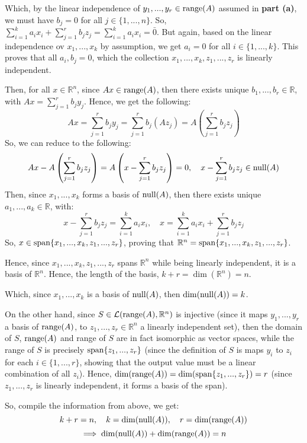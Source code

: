 \documentclass{article}
\begin{document}
\begin{itemize}
    Which, by the linear independence of $y_1,...,y_r\in\textmd{range}(A)$ assumed in \textbf{part (a)}, we must have $b_j = 0$ for all $j\in\{1,...,n\}$. So, $\sum_{i=1}^{k}a_ix_i+\sum_{j=1}^{r}b_jz_j = \sum_{i=1}^{k}a_ix_i = \bar{0}$. But again, based on the linear independence ov $x_1,...,x_k$ by assumption, we get $a_i=0$ for all $i\in\{1,...,k\}$.
    This proves that all $a_i,b_j = 0$, which the collection $x_1,...,x_k,z_1,...,z_r$ is linearly independent.

    Then, for all $x\in\mathbb{R}^n$, since $Ax \in\textmd{range}(A)$, then there exists unique $b_1,...,b_r\in\mathbb{R}$, with $Ax =\sum_{j=1}^{r}b_jy_j$. Hence, we get the following:
    $$Ax=\sum_{j=1}^{r}b_jy_j=\sum_{j=1}^{r}b_j(Az_j) = A\left(\sum_{j=1}^{r}b_jz_j\right)$$
    So, we can reduce to the following:
    $$Ax-A\left(\sum_{j=1}^{r}b_jz_j\right)=A\left(x-\sum_{j=1}^{r}b_jz_j\right) = 0,\quad x-\sum_{j=1}^{r}b_jz_j\in\textmd{null}(A)$$
    Then, since $x_1,...,x_k$ forms a basis of $\textmd{null}(A)$, then there exists unique $a_1,...,a_k\in\mathbb{R}$, with:
    $$x-\sum_{j=1}^{r}b_jz_j = \sum_{i=1}^{k}a_ix_i,\quad x=\sum_{i=1}^{k}a_ix_i+\sum_{j=1}^{r}b_jz_j$$
    So, $x\in \textmd{span}\{x_1,...,x_k,z_1,...,z_r\}$, proving that $\mathbb{R}^n = \textmd{span}\{x_1,...,x_k,z_1,...,z_r\}$.

    \hfil

    Hence, since $x_1,...,x_k,z_1,...,z_r$ spans $\mathbb{R}^n$ while being linearly independent, it is a basis of $\mathbb{R}^n$. Hence, the length of the basis, $k+r = \dim(\mathbb{R}^n) = n$.

    Which, since $x_1,...,x_k$ is a basis of $\textmd{null}(A)$, then $\dim(\textmd{null}(A)) = k$.
    
    On the other hand, since $S\in\mathcal{L}(\textmd{range}(A),\mathbb{R}^n)$ is injective (since it maps $y_1,...,y_r$ a basis of $\textmd{range}(A)$, to $z_1,...,z_r\in\mathbb{R}^n$ a linearly independent set), then the domain of $S$, $\textmd{range}(A)$ and range of $S$ are in fact isomorphic as vector spaces, while the range of $S$ is precisely $\textmd{span}\{z_1,...,z_r\}$ (since the definition of $S$ is maps $y_i$ to $z_i$ for each $i\in\{1,...,r\}$, showing that the output value must be a linear combination of all $z_i$).
    Hence, $\dim(\textmd{range}(A)) = \dim(\textmd{span}\{z_1,...,z_r\}) = r$ (since $z_1,...,z_r$ is linearly independent, it forms a basis of the span).

    So, compile the information from above, we get:
    $$k+r = n,\quad k=\dim(\textmd{null}(A)),\quad r=\dim(\textmd{range}(A))$$
    $$\implies \dim(\textmd{null}(A))+\dim(\textmd{range}(A))=n$$

\end{itemize}
\end{document}
